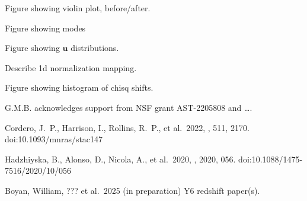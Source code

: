 \documentclass[linenumbers, onecolumn]{aastex63}
\newcommand{\vecu}{\ensuremath{\mathbf{u}}}
\begin{document}
Figure showing violin plot, before/after.

Figure showing modes

Figure showing $\vecu$ distributions.

Describe 1d normalization mapping.

Figure showing histogram of chisq shifts.


  \begin{acknowledgments}


G.M.B. acknowledges support from NSF grant AST-2205808 and \ldots.

\end{acknowledgments}
\begin{thebibliography}{dummy}
%
%
 Cordero, J.~P., Harrison, I., Rollins, R.~P., et al.\ 2022, \mnras, 511, 2170. doi:10.1093/mnras/stac147

 Hadzhiyska, B., Alonso, D., Nicola, A., et al.\ 2020, \jcap, 2020, 056. doi:10.1088/1475-7516/2020/10/056
\end{thebibliography}

 Boyan, William, ??? et al.\ 2025 (in preparation)
Y6 redshift paper(s).
\end{document}
